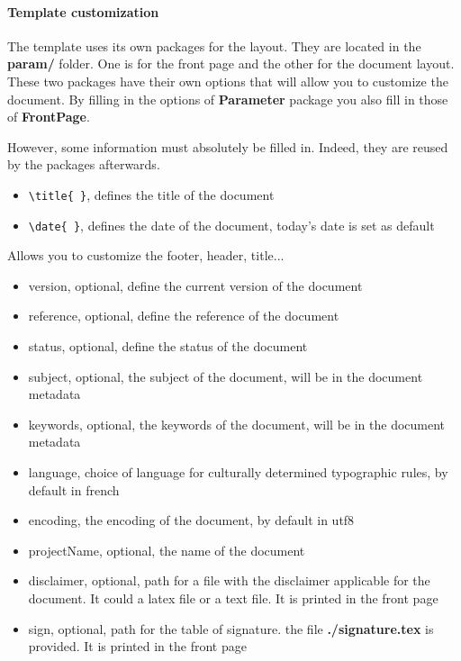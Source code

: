 \paragraph{Template customization} \label{customization}
The template uses its own packages for the layout.
They are located in the \textbf{param/} folder.
One is for the front page and the other for the document layout. These two packages have their own
options that will allow you to customize the document.
By filling in the options of \textbf{Parameter} package you also fill in those of
\textbf{FrontPage}. \newline

However, some information must absolutely be filled in. Indeed, they are reused by the packages
afterwards.
\begin{itemize}
    \item \verb=\title{ }=, defines the title of the document
    \item \verb=\date{ }=, defines the date of the document, today's date is set as default\newline
\end{itemize}

Allows you to customize the footer, header, title...
\begin{itemize}
    \item version, optional, define the current version of the document
    \item reference, optional, define the reference of the document
    \item status, optional, define the status of the document
    \item subject, optional, the subject of the document, will be in the document metadata
    \item keywords, optional, the keywords of the document, will be in the document metadata
    \item language, choice of language for culturally determined typographic rules, by default in
          french \label{language}
    \item encoding, the encoding of the document, by default in utf8
    \item projectName,  optional, the name of the document
    \item disclaimer,  optional, path for a file with the disclaimer applicable for the document.
          It could a \gls{latex} file or a text file. It is printed in the front page
    \item sign,  optional, path for the table of signature. the file \textbf{./signature.tex} is
          provided. It is printed in the front page
\end{itemize}


